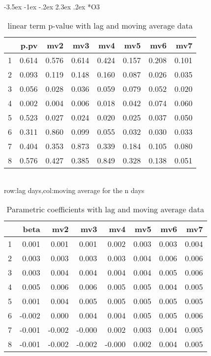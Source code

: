 \documentclass[a4paper, 12pt]{article}
\makeatletter
\def\large{\fontsize{14}{20}\selectfont}
\renewcommand\subsection{\@startsection {subsection}{1}{\z@}%
                                   {-3.5ex \@plus -1ex \@minus -.2ex}%
                                   {2.3ex \@plus.2ex}%
                                   {\centering\normalfont\large\bfseries}}
\makeatother
\begin{document}
\subsection*{O3}
\begin{table}[h]
\centering
\caption{linear term p-value with lag and moving average data}
\begin{tabular}{rrrrrrrr}
  \hline
 & p.pv & mv2 & mv3 & mv4 & mv5 & mv6 & mv7 \\
  \hline
1 & 0.614 & 0.576 & 0.614 & 0.424 & 0.157 & 0.208 & 0.101 \\
  2 & 0.093 & 0.119 & 0.148 & 0.160 & 0.087 & 0.026 & 0.035 \\
  3 & 0.056 & 0.028 & 0.036 & 0.059 & 0.079 & 0.052 & 0.020 \\
  4 & 0.002 & 0.004 & 0.006 & 0.018 & 0.042 & 0.074 & 0.060 \\
  5 & 0.523 & 0.027 & 0.024 & 0.020 & 0.025 & 0.037 & 0.050 \\
  6 & 0.311 & 0.860 & 0.099 & 0.055 & 0.032 & 0.030 & 0.033 \\
  7 & 0.404 & 0.353 & 0.873 & 0.339 & 0.184 & 0.105 & 0.080 \\
  8 & 0.576 & 0.427 & 0.385 & 0.849 & 0.328 & 0.138 & 0.051 \\
   \hline
\end{tabular}
\\row:lag days,col:moving average for the n days
\end{table}

\begin{table}[h]
\centering
\caption{Parametric coefficients with lag and moving average data}
\begin{tabular}{rrrrrrrr}
  \hline
 & beta & mv2 & mv3 & mv4 & mv5 & mv6 & mv7 \\
  \hline
1 & 0.001 & 0.001 & 0.001 & 0.002 & 0.003 & 0.003 & 0.004 \\
  2 & 0.003 & 0.003 & 0.003 & 0.003 & 0.004 & 0.006 & 0.006 \\
  3 & 0.003 & 0.004 & 0.004 & 0.004 & 0.004 & 0.005 & 0.006 \\
  4 & 0.005 & 0.006 & 0.006 & 0.005 & 0.005 & 0.004 & 0.005 \\
  5 & 0.001 & 0.004 & 0.005 & 0.005 & 0.005 & 0.005 & 0.005 \\
  6 & -0.002 & 0.000 & 0.004 & 0.004 & 0.005 & 0.005 & 0.006 \\
  7 & -0.001 & -0.002 & -0.000 & 0.002 & 0.003 & 0.004 & 0.005 \\
  8 & -0.001 & -0.002 & -0.002 & -0.000 & 0.002 & 0.004 & 0.005 \\
   \hline
\end{tabular}
\end{table}
\end{document}

